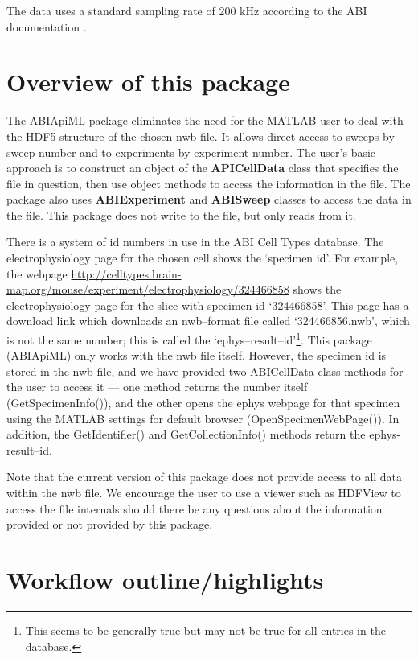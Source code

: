 \documentclass{article}
\begin{document}
The data uses a standard sampling rate of 200 kHz according to the ABI documentation \citep{ABI2015a}.

\section{Overview of this package}
The ABIApiML package eliminates the need for the MATLAB user to deal with the HDF5 structure of the chosen nwb file.  It allows direct access to sweeps by sweep number and to experiments by experiment number.  The user's basic approach is to construct an object of the \textbf{APICellData} class that specifies the file in question, then use object methods to access the information in the file. The package also uses \textbf{ABIExperiment} and \textbf{ABISweep} classes to access the data in the file.   This package does not write to the file, but only reads from it.

There is a system of id numbers in use in the ABI Cell Types database.  The electrophysiology page for the chosen cell shows the `specimen id'. For example, the webpage \url{http://celltypes.brain-map.org/mouse/experiment/electrophysiology/324466858} shows the electrophysiology page for the slice with specimen id `324466858'.  This page has a download link which downloads an nwb--format file called `324466856.nwb', which is not the same number; this is called the `ephys--result--id'\footnote{This seems to be generally true but may not be true for all entries in the database.}.  This package (ABIApiML) only works with the nwb file itself. However, the specimen id is stored in the nwb file, and we have provided two ABICellData class methods for the user to access it --- one method returns the number itself (GetSpecimenInfo()), and the other opens the ephys webpage for that specimen using the MATLAB settings for default browser (OpenSpecimenWebPage()).  In addition, the GetIdentifier() and GetCollectionInfo() methods return the ephys-result--id.

Note that the current version of this package does not provide access to all data within the nwb file.  We encourage the user to use a viewer such as HDFView to access the file internals should there be any questions about the information provided or not provided by this package.

\section{Workflow outline/highlights}
\end{document}
